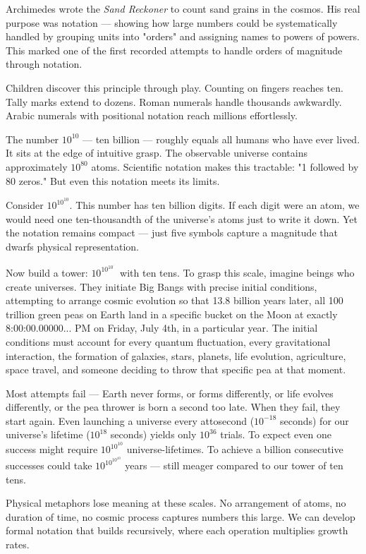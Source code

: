 Archimedes wrote the \emph{Sand Reckoner} to count sand grains in the cosmos. His real purpose was notation — showing how large numbers could be systematically handled by grouping units into "orders" and assigning names to powers of powers. This marked one of the first recorded attempts to handle orders of magnitude through notation.

Children discover this principle through play. Counting on fingers reaches ten. Tally marks extend to dozens. Roman numerals handle thousands awkwardly. Arabic numerals with positional notation reach millions effortlessly.

The number $10^{10}$ — ten billion — roughly equals all humans who have ever lived. It sits at the edge of intuitive grasp. The observable universe contains approximately $10^{80}$ atoms. Scientific notation makes this tractable: "1 followed by 80 zeros." But even this notation meets its limits.

Consider $10^{10^{10}}$. This number has ten billion digits. If each digit were an atom, we would need one ten-thousandth of the universe's atoms just to write it down. Yet the notation remains compact — just five symbols capture a magnitude that dwarfs physical representation.

Now build a tower: $10^{10^{10^{\cdot^{\cdot^{\cdot}}}}}$ with ten tens. To grasp this scale, imagine beings who create universes. They initiate Big Bangs with precise initial conditions, attempting to arrange cosmic evolution so that 13.8 billion years later, all 100 trillion green peas on Earth land in a specific bucket on the Moon at exactly 8:00:00.00000... PM on Friday, July 4th, in a particular year. The initial conditions must account for every quantum fluctuation, every gravitational interaction, the formation of galaxies, stars, planets, life evolution, agriculture, space travel, and someone deciding to throw that specific pea at that moment.

Most attempts fail — Earth never forms, or forms differently, or life evolves differently, or the pea thrower is born a second too late. When they fail, they start again. Even launching a universe every attosecond ($10^{-18}$ seconds) for our universe's lifetime ($10^{18}$ seconds) yields only $10^{36}$ trials. To expect even one success might require $10^{10^{10}}$ universe-lifetimes. To achieve a billion consecutive successes could take $10^{10^{10^{10}}}$ years — still meager compared to our tower of ten tens.

Physical metaphors lose meaning at these scales. No arrangement of atoms, no duration of time, no cosmic process captures numbers this large. We can develop formal notation that builds recursively, where each operation multiplies growth rates.

